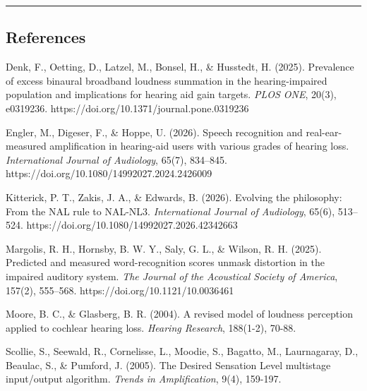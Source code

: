 \documentclass[
]{article}
\begin{document}
\begin{center}\rule{0.5\linewidth}{0.5pt}\end{center}

\subsection{References}\label{references}

Denk, F., Oetting, D., Latzel, M., Bonsel, H., \& Husstedt, H. (2025).
Prevalence of excess binaural broadband loudness summation in the
hearing-impaired population and implications for hearing aid gain
targets. \emph{PLOS ONE}, 20(3), e0319236.
https://doi.org/10.1371/journal.pone.0319236

Engler, M., Digeser, F., \& Hoppe, U. (2026). Speech recognition and
real-ear-measured amplification in hearing-aid users with various grades
of hearing loss. \emph{International Journal of Audiology}, 65(7),
834--845. https://doi.org/10.1080/14992027.2024.2426009

Kitterick, P. T., Zakis, J. A., \& Edwards, B. (2026). Evolving the
philosophy: From the NAL rule to NAL-NL3. \emph{International Journal of
Audiology}, 65(6), 513--524.
https://doi.org/10.1080/14992027.2026.42342663

Margolis, R. H., Hornsby, B. W. Y., Saly, G. L., \& Wilson, R. H.
(2025). Predicted and measured word-recognition scores unmask distortion
in the impaired auditory system. \emph{The Journal of the Acoustical
Society of America}, 157(2), 555--568.
https://doi.org/10.1121/10.0036461

Moore, B. C., \& Glasberg, B. R. (2004). A revised model of loudness
perception applied to cochlear hearing loss. \emph{Hearing Research},
188(1-2), 70-88.

Scollie, S., Seewald, R., Cornelisse, L., Moodie, S., Bagatto, M.,
Laurnagaray, D., Beaulac, S., \& Pumford, J. (2005). The Desired
Sensation Level multistage input/output algorithm. \emph{Trends in
Amplification}, 9(4), 159-197.
\end{document}
